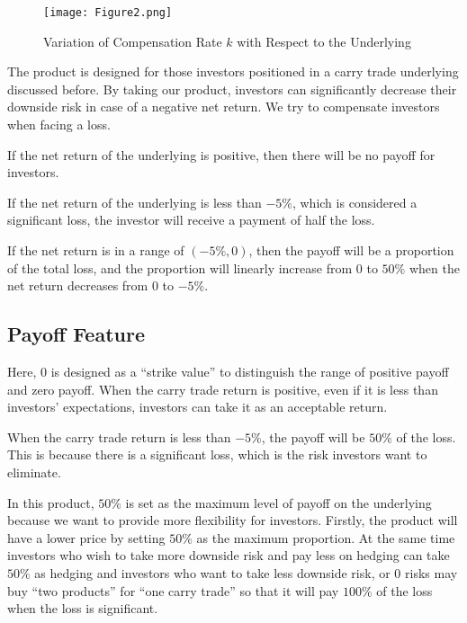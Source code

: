 \documentclass[a4paper, twocolumn]{article}
\begin{document}
\begin{figure}[ht]
    \begin{center}
    \texttt{[image: Figure2.png]}
    \caption{Variation of Compensation Rate \(k\) with Respect to the Underlying}
    \label{fig:picture1}
    \end{center}
\end{figure}

The product is designed for those investors positioned in a carry trade underlying discussed before. By taking our product, investors can significantly decrease their downside risk in case of a negative net return. We try to compensate investors when facing a loss. 

If the net return of the underlying is positive, then there will be no payoff for investors. 

If the net return of the underlying is less than \(-5\%\), which is considered a significant loss, the investor will receive a payment of half the loss. 

If the net return is in a range of \((-5\%, 0)\), then the payoff will be a proportion of the total loss, and the proportion will linearly increase from \(0\) to \(50\%\) when the net return decreases from 0 to \(-5\%\). 

\subsection{Payoff Feature}

Here, \(0\) is designed as a “strike value” to distinguish the range of positive payoff and zero payoff. When the carry trade return is positive, even if it is less than investors’ expectations, investors can take it as an acceptable return. 

When the carry trade return is less than \(-5\%\), the payoff will be \(50\%\) of the loss. This is because there is a significant loss, which is the risk investors want to eliminate.

In this product, \(50\%\) is set as the maximum level of payoff on the underlying because we want to provide more flexibility for investors. Firstly, the product will have a lower price by setting \(50\%\) as the maximum proportion. At the same time investors who wish to take more downside risk and pay less on hedging can take \(50\%\) as hedging and investors who want to take less downside risk, or 0 risks may buy “two products” for “one carry trade” so that it will pay \(100\%\) of the loss when the loss is significant.
\end{document}
